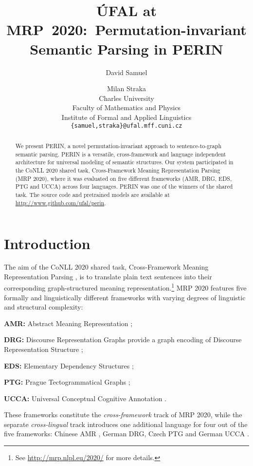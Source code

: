 \documentclass[11pt,a4paper]{article}
\title{ÚFAL at MRP~2020:\ Permutation-invariant Semantic Parsing in PERIN}
\author{David Samuel \and Milan Straka \\
  Charles University \\
  Faculty of Mathematics and Physics \\
  Institute of Formal and Applied Linguistics \\
  \texttt{\{samuel,straka\}@ufal.mff.cuni.cz}\\}
\date{}
\newenvironment{citemize}{\begin{list}{}{\topsep=\smallskipamount\itemsep=1pt\parsep=1pt\labelwidth=.5em}}{\end{list}}
\begin{document}
\maketitle

\begin{abstract}
We present PERIN, a novel permutation-invariant approach to sentence-to-graph semantic parsing. PERIN is a versatile, cross-framework and language independent architecture for universal modeling of semantic structures. Our system participated in the CoNLL 2020 shared task, Cross-Framework Meaning Representation Parsing (MRP 2020), where it was evaluated on five different frameworks (AMR, DRG, EDS, PTG and UCCA) across four languages. PERIN was one of the winners of the shared task. The source code and pretrained models are available at \url{http://www.github.com/ufal/perin}.
\end{abstract} \section{Introduction}

The aim of the CoNLL 2020 shared task, Cross-Framework Meaning Representation Parsing \cite[MRP 2020;][]{Oep:Abe:Abz:20}, is to translate plain text sentences into their corresponding graph-structured meaning representation.\hspace{-.08em}\footnote{See \url{http://mrp.nlpl.eu/2020/} for more details.} MRP 2020 features five formally and linguistically different frameworks with varying degrees of linguistic and structural complexity:

\begin{citemize}
  \item \textbf{AMR:} Abstract Meaning Representation \cite{banarescu2013abstract};
  \item \textbf{DRG:} Discourse Representation Graphs  \cite{abzianidze-etal-2017-parallel} provide a graph encoding of Discourse Representation Structure \cite{van1992presupposition};
  \item \textbf{EDS:} Elementary Dependency Structures \cite{oepen2006discriminant};
  \item \textbf{PTG:} Prague Tectogrammatical Graphs \cite{hajic2012announcing};
  \item \textbf{UCCA:} Universal Conceptual Cognitive Annotation \cite{abend2013universal}.
\end{citemize}

\goodbreak

\noindent
These frameworks constitute the \emph{cross-framework} track of MRP 2020, while the separate \emph{cross-lingual} track introduces one additional language for four out of the five frameworks: Chinese AMR \cite{li2016annotating}, German DRG, Czech PTG and German UCCA \cite{hershcovich-etal-2019-semeval}.
\end{document}
